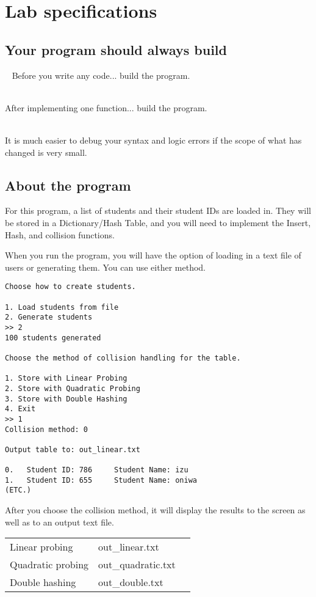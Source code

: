 \documentclass[a4paper,12pt,oneside]{book}
\begin{document}
\section{Lab specifications}

\subsection{Your program should always build}

\begin{error}{\ }
Before you write any code... build the program.

~\\
After implementing one function... build the program.

~\\
It is much easier to debug your syntax and logic errors if the scope
of what has changed is very small.
\end{error}

\subsection{About the program}

For this program, a list of students and their student IDs are
loaded in.
They will be stored in a Dictionary/Hash Table, and you will need to
implement the Insert, Hash, and collision functions.

When you run the program, you will have the option of loading in
a text file of users or generating them. You can use either method.

\begin{lstlisting}[style=output]
Choose how to create students.

1. Load students from file
2. Generate students
>> 2
100 students generated

Choose the method of collision handling for the table.

1. Store with Linear Probing
2. Store with Quadratic Probing
3. Store with Double Hashing
4. Exit
>> 1
Collision method: 0

Output table to: out_linear.txt

0.   Student ID: 786 	 Student Name: izu
1.   Student ID: 655 	 Student Name: oniwa
(ETC.)
\end{lstlisting}

After you choose the collision method, it will display the results
to the screen as well as to an output text file.

\begin{center}
    \begin{tabular}{l l l}
        Linear probing & out\_linear.txt \\
        Quadratic probing & out\_quadratic.txt \\
        Double hashing & out\_double.txt    
    \end{tabular}
\end{center}
\end{document}
